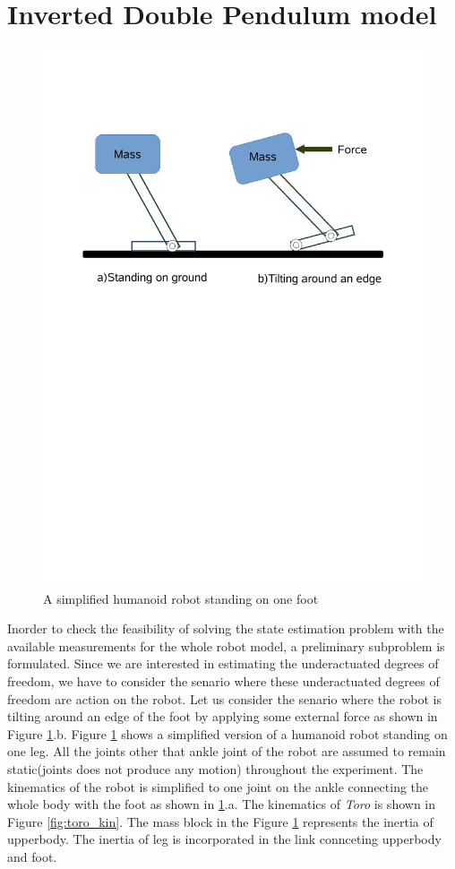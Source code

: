 \section{Inverted Double Pendulum model} 
\begin{figure}
	\centering
	\includegraphics[trim = 0mm 160mm 0mm 30mm, scale=0.75]{Bilder/simp_uactcase.pdf}
	\caption{A simplified humanoid robot standing on one foot}
	\label{fig:idp_scene}
\end{figure}
Inorder to check the feasibility of solving the state estimation problem with the available measurements for the whole robot model, a preliminary subproblem is formulated. Since we are interested in estimating the underactuated degrees of freedom, we have to consider the senario where these underactuated degrees of freedom are action on the robot. Let us consider the senario where the robot is tilting around an edge of the foot by applying some external force as shown in Figure \ref{fig:idp_scene}.b. Figure \ref{fig:idp_scene} shows a simplified version of a humanoid robot standing on one leg. All the joints other that ankle joint of the robot are assumed to remain static(joints does not produce any motion) throughout the experiment. The kinematics of the robot is simplified to one joint on the ankle connecting the whole body with the foot as shown in \ref{fig:idp_scene}.a. The kinematics of \emph{Toro} is shown in Figure \ref{fig:toro_kin}. The mass block in the Figure \ref{fig:idp_scene} represents the inertia of upperbody. The inertia of leg is incorporated in the link connceting upperbody and foot. 

